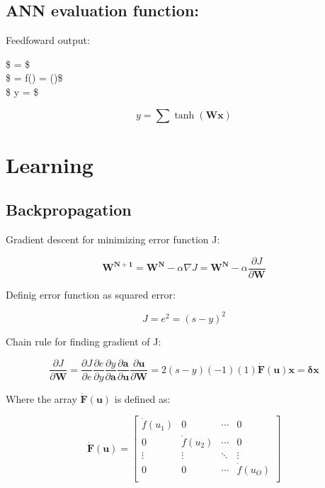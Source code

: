\documentclass[11pt]{article}
\begin{document}
    \hypertarget{ann-evaluation-function}{%
\subsection{ANN evaluation function:}\label{ann-evaluation-function}}

    Feedfoward output:

\$  =  \$\\
\$  = f() = \tanh()\$\\
\$ y = \sum {}\$

\[
    y = \sum \tanh{(\mathbf{Wx})}
\]

    \hypertarget{learning}{%
\section{Learning}\label{learning}}

    \hypertarget{backpropagation}{%
\subsection{Backpropagation}\label{backpropagation}}

    Gradient descent for minimizing error function J:

\[
\mathbf{W^{N+1}} = \mathbf{W^N} - \alpha \nabla{J} =  \mathbf{W^N} - \alpha \frac{\partial{J}}{\partial{\mathbf{W}}}
\]

    Definig error function as squared error:

\[
J = e^2 = (s-y)^2
\]

    Chain rule for finding gradient of J:

\[
\frac{\partial{J}}{\partial{\mathbf{W}}} = \frac{\partial{J}}{\partial{e}} \frac{\partial{e}}{\partial{y}} \frac{\partial{y}}{\partial{\mathbf{a}}} \frac{\partial{\mathbf{a}}}{\partial{\mathbf{u}}} \frac{\partial{\mathbf{u}}}{\partial{\mathbf{W}}} = 2 (s - y) (-1) (1) \mathbf{\dot{F}(u)} \mathbf{x} = \boldsymbol{\delta} \mathbf {x}
\]

    Where the array \(\mathbf{\dot{F}(u)}\) is defined as:

\[
\mathbf{\dot{F}(u)} = 
\begin{bmatrix}
  \dot{f}(u_1) & 0 & \cdots  & 0 \\
  0 & \dot{f}(u_2) & \cdots  & 0 \\
  \vdots   & \vdots & \ddots & \vdots \\
  0 & 0 & \cdots  & \dot{f}(u_O) \\
\end{bmatrix}
\]
\end{document}
